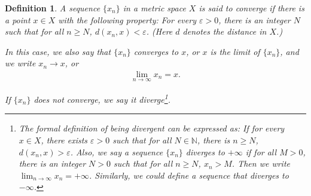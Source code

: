 \documentclass[10pt]{book}
\newtheorem{definition}{Definition}[chapter]
\theoremstyle{definition}
\numberwithin{equation}{chapter}
\begin{document}
\begin{definition}
A sequence $\{x_n\}$ in a metric space $X$ is said to converge if there is a point $x \in X$ with the following property: For every $\varepsilon > 0$, there is an integer $N$ such that for all $n \geq N$, $d(x_n,x) < \varepsilon$. (Here $d$ denotes the distance in $X$.)

In this case, we also say that $\{x_n\}$ converges to $x$, or $x$ is the limit of $\{x_n\}$, and we write $x_n \to x$, or
\begin{align*}
    \lim_{n\to\infty} x_n = x.
\end{align*}

If $\{x_n\}$ does not converge, we say it diverge\footnote{The formal definition of being divergent can be expressed as: If for every $x \in X$, there exists $\varepsilon > 0$ such that for all $N \in \mathbb{N}$, there is $n \geq N$, $d(x_n,x) > \varepsilon$. Also, we say a sequence $\{x_n\}$ diverges to $+\infty$ if for all $M > 0$, there is an integer $N > 0$ such that for all $n \geq N$, $x_n > M$. Then we write $\lim_{n\to\infty} x_n = + \infty$. Similarly, we could define a sequence that diverges to $-\infty$.}.
\end{definition}

\medskip
\end{document}
